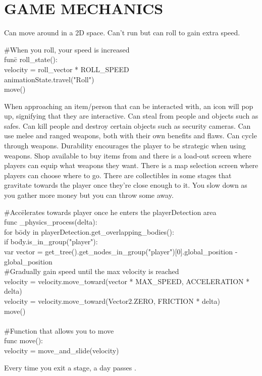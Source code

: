 \documentclass{article}
\begin{document}
\section{GAME MECHANICS \label{mechanics}}
Can move around in a 2D space. Can't run but can roll to gain extra speed.
\bigbreak
\begin{tabbing}
\#When you roll, your speed is increased\\
fun\= c roll\_state():\\
\>	velocity = roll\_vector * ROLL\_SPEED\\
\>	animationState.travel("Roll")\\
\>	move()\\
\end{tabbing}
\bigbreak
When approaching an item/person that can be interacted with, an icon will pop up, signifying that they are interactive. Can steal from people and objects such as safes. Can kill people and destroy certain objects such as security cameras. Can use melee and ranged weapons, both with their own benefits and flaws. Can cycle through weapons. Durability encourages the player to be strategic when using weapons. Shop available to buy items from and there is a load-out screen where players can equip what weapons they want. There is a map selection screen where players can choose where to go. There are collectibles in some stages that gravitate towards the player once they're close enough to it. You slow down as you gather more money but you can throw some away. 
\bigbreak
\begin{tabbing}
\#Acc\=elerates towards player once he enters the playerDetection area\\
func \_physics\_process(delta):\\
\> for  b\= ody in playerDetection.get\_overlapping\_bodies():\\
\> \> if bo\=dy.is\_in\_group("player"):\\
\> \> \> var vector = get\_tree().get\_nodes\_in\_group("player")[0].global\_position - global\_position\\
\> \> \> \#Gradually gain speed until the max velocity is reached\\
\> \> \> velocity = velocity.move\_toward(vector * MAX\_SPEED, ACCELERATION * delta) \\
\> velocity = velocity.move\_toward(Vector2.ZERO, FRICTION * delta)\\
\> move()\\ \\
\#Function that allows you to move\\
func move():\\
\> velocity = move\_and\_slide(velocity)
\end{tabbing}
\bigbreak
Every time you exit a stage, a day passes .
\end{document}
